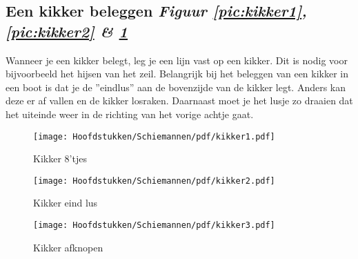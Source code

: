 \subsection{Een kikker beleggen \hfill \textit{Figuur \ref{pic:kikker1}, \ref{pic:kikker2} \& \ref{pic:kikker3}}}
Wanneer je een kikker belegt, leg je een lijn vast op een kikker. Dit is nodig voor bijvoorbeeld het hijsen van het zeil. Belangrijk bij het beleggen van een kikker in een boot is dat je de ''eindlus'' aan de bovenzijde van de kikker legt. Anders kan deze er af vallen en de kikker losraken. Daarnaast moet je het lusje zo draaien dat het uiteinde weer in de richting van het vorige achtje gaat.
\begin{figure}[h]
  \centering
  \begin{minipage}[b]{0.32\textwidth}
  \centering
    \texttt{[image: Hoofdstukken/Schiemannen/pdf/kikker1.pdf]}
    \caption{Kikker 8'tjes}
    \label{pic:kikker1}
  \end{minipage}
  \hfill
  \begin{minipage}[b]{0.32\textwidth}
    \centering
    \texttt{[image: Hoofdstukken/Schiemannen/pdf/kikker2.pdf]}
    \caption{Kikker eind lus}
    \label{pic:kikker2}
    \end{minipage}
  \hfill
   \begin{minipage}[b]{0.32\textwidth}
    \centering
    \texttt{[image: Hoofdstukken/Schiemannen/pdf/kikker3.pdf]}
    \caption{Kikker afknopen}
    \label{pic:kikker3}
    \end{minipage}
\end{figure}
